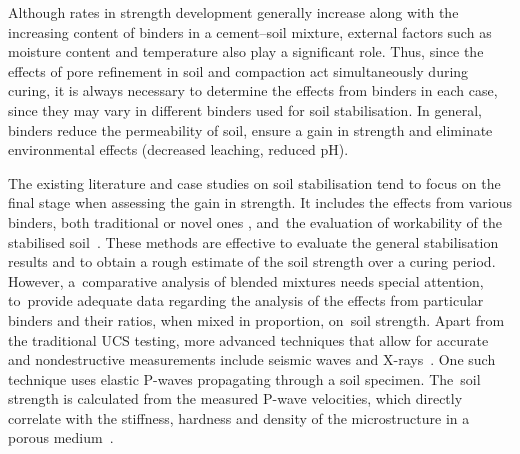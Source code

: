 \documentclass[electronics,article,accept,pdftex,moreauthors]{Definitions/mdpi}
\begin{document}
Although rates in strength development{ }generally increase{ along }with {the} increasing content of binders in {a} cement--soil mixture, external factors {such as }moisture content and temperature{ }also play a significant role. Thus, since the effects of pore refinement in soil and compaction act simultaneously during curing{, }it is always necessary to determine{ }the effects from binders{ in each case, since they may} vary {in different} binders used for soil stabilisation. {In general, binders} reduce the permeability of soil, {ensure} a gain in strength and {eliminate} environmental effects (decreased leaching, reduced pH).

The existing literature and case studies on soil stabilisation tend to focus on the final stage when assessing the gain in strength. It {includes} the effects from various binders, both traditional \citep{Boswell,Sharma2017,Sahuetal2017} or novel {ones} \cite{Saffari,YadavTiwari}, and~the evaluation of workability of {the} stabilised soil~\cite{Ogila}. These methods are effective to evaluate the general stabilisation results and to obtain a rough estimate of the soil strength over a curing period. However, a~comparative analysis of blended mixtures needs special attention, to~provide adequate data regarding the analysis of the effects from particular binders and their ratios, when mixed in proportion, on~soil strength. Apart from the traditional UCS testing{, }more advanced techniques that allow for accurate and nondestructive measurements{ }include seismic waves and X-rays~\cite{Kierlik,Wani}. One such technique {uses} elastic P-waves {propagating} through { a soil specimen. The~soil} strength is calculated from the {measured P-}wave velocities, which directly correlate with {the} stiffness, hardness and density {of the} microstructure {in a} porous medium~\cite{Fakhrabadi,Sharma2011}.
\end{document}
